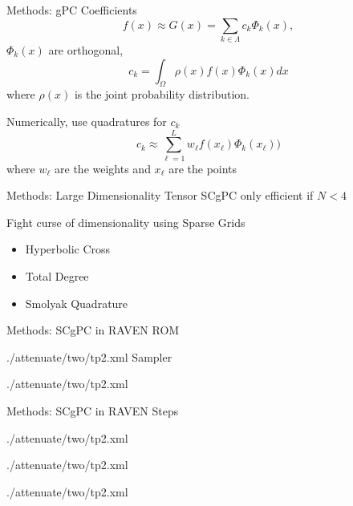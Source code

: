 \documentclass[t,9pt,svgnames]{beamer}
\begin{document}
\begin{frame}{Methods: gPC Coefficients}
  \begin{equation}
    f(x) \approx G(x) = \sum_{k\in\Lambda} c_k \Phi_k(x), 
  \end{equation}
  $\Phi_k(x)$ are orthogonal,
  \begin{equation}
    c_k = \int_\Omega \rho(x) f(x) \Phi_k(x) dx
  \end{equation}
  where $\rho(x)$ is the joint probability distribution.

  Numerically, use quadratures for $c_k$
  \begin{equation}
    c_k \approx\sum_{\ell=1}^L w_\ell f(x_\ell) \Phi_k(x_\ell))
  \end{equation}
  where $w_\ell$ are the weights and $x_\ell$ are the points
\end{frame}

\begin{frame}{Methods: Large Dimensionality}
  Tensor SCgPC only efficient if $N<4$

  Fight curse of dimensionality using Sparse Grids
  \begin{itemize}
    \item Hyperbolic Cross
    \item Total Degree
    \item Smolyak Quadrature
  \end{itemize}
\end{frame}

\begin{frame}[fragile]{Methods: SCgPC in RAVEN}
  ROM
  
          {./attenuate/two/tp2.xml}
  Sampler
  
          {./attenuate/two/tp2.xml}
\end{frame}

\begin{frame}[fragile]{Methods: SCgPC in RAVEN}
  Steps
  
          {./attenuate/two/tp2.xml}
  
          {./attenuate/two/tp2.xml}
  
          {./attenuate/two/tp2.xml}
\end{frame}
\end{document}
